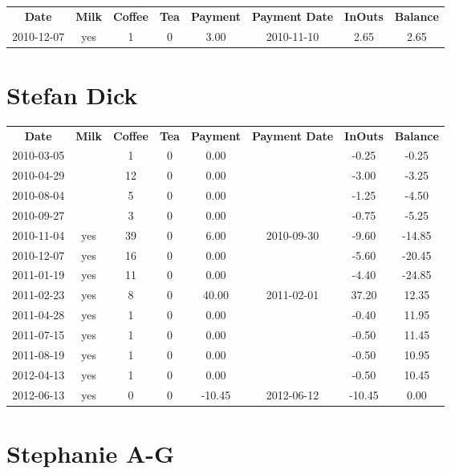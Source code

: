 \begin{center}
\begin{tabular}{cccccccc}
\textbf{Date} & \textbf{Milk} & \textbf{Coffee} & \textbf{Tea} & \textbf{Payment} & \textbf{Payment Date} & \textbf{InOuts} & \textbf{Balance} \\
2010-12-07 & yes & 1 & 0 & 3.00 & 2010-11-10 & 2.65 & 2.65
\end{tabular}
\end{center}

\section{Stefan Dick}

\begin{center}
\begin{tabular}{cccccccc}
\textbf{Date} & \textbf{Milk} & \textbf{Coffee} & \textbf{Tea} & \textbf{Payment} & \textbf{Payment Date} & \textbf{InOuts} & \textbf{Balance} \\
2010-03-05 &  &  1 & 0 &   0.00 &  &  -0.25 &  -0.25\\ 
2010-04-29 &  & 12 & 0 &   0.00 &  &  -3.00 &  -3.25\\ 
2010-08-04 &  &  5 & 0 &   0.00 &  &  -1.25 &  -4.50\\ 
2010-09-27 &  &  3 & 0 &   0.00 &  &  -0.75 &  -5.25\\ 
2010-11-04 & yes & 39 & 0 &   6.00 & 2010-09-30 &  -9.60 & -14.85\\ 
2010-12-07 & yes & 16 & 0 &   0.00 &  &  -5.60 & -20.45\\ 
2011-01-19 & yes & 11 & 0 &   0.00 &  &  -4.40 & -24.85\\ 
2011-02-23 & yes &  8 & 0 &  40.00 & 2011-02-01 &  37.20 &  12.35\\ 
2011-04-28 & yes &  1 & 0 &   0.00 &  &  -0.40 &  11.95\\ 
2011-07-15 & yes &  1 & 0 &   0.00 &  &  -0.50 &  11.45\\ 
2011-08-19 & yes &  1 & 0 &   0.00 &  &  -0.50 &  10.95\\ 
2012-04-13 & yes &  1 & 0 &   0.00 &  &  -0.50 &  10.45\\ 
2012-06-13 & yes &  0 & 0 & -10.45 & 2012-06-12 & -10.45 &   0.00
\end{tabular}
\end{center}

\section{Stephanie A-G}

